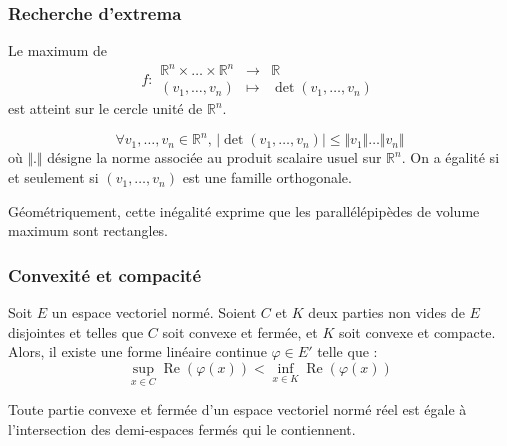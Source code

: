   \subsubsection{Recherche d'extrema}


  \begin{proposition}
    Le maximum de
    \[
    f :
    \begin{array}{ccc}
      \mathbb{R}^n \times \dots \times \mathbb{R}^n &\rightarrow& \mathbb{R} \\
      (v_1, \dots, v_n) &\mapsto& \det(v_1, \dots, v_n)
    \end{array}
    \]
    est atteint sur le cercle unité de $\mathbb{R}^n$.
  \end{proposition}

  \begin{corollary}
    \[ \forall v_1, \dots, v_n \in \mathbb{R}^n, \, \vert \det(v_1, \dots, v_n) \vert \leq \Vert v_1 \Vert \dots \Vert v_n \Vert \]
    où $\Vert . \Vert$ désigne la norme associée au produit scalaire usuel sur $\mathbb{R}^n$. On a égalité si et seulement si $(v_1, \dots, v_n)$ est une famille orthogonale.
  \end{corollary}

  \begin{remark}
    Géométriquement, cette inégalité exprime que les parallélépipèdes de volume maximum sont rectangles.
  \end{remark}

  \subsubsection{Convexité et compacité}


  \begin{theorem}
    Soit $E$ un espace vectoriel normé. Soient $C$ et $K$ deux parties non vides de $E$ disjointes et telles que $C$ soit convexe et fermée, et $K$ soit convexe et compacte.
    Alors, il existe une forme linéaire continue $\varphi \in E'$ telle que :
    \[ \sup_{x \in C} \operatorname{Re}(\varphi(x)) < \inf_{x \in K} \operatorname{Re}(\varphi(x)) \]
  \end{theorem}

  \begin{corollary}
    Toute partie convexe et fermée d'un espace vectoriel normé réel est égale à
    l'intersection des demi-espaces fermés qui le contiennent.
  \end{corollary}

